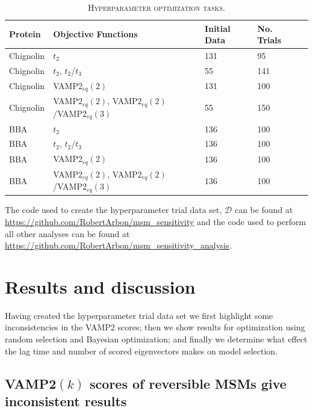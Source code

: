 \documentclass[journal=jacsat,manuscript=article]{achemso}
\begin{document}
\begin{table}[ht]
    \caption{\textsc{Hyperparameter optimization tasks.}}
    \begin{tabularx}{\textwidth}{llXXX}
    \toprule
    \textbf{Protein} & \textbf{Objective Functions} & \textbf{Initial Data} & \textbf{No. Trials} \\ 
    
    \midrule
    Chignolin & $t_2$        & 131 & 95 \\
    Chignolin & $t_2$, $t_2$/$t_3$ & 55 & 141 \\
    Chignolin & VAMP2$_{eq}(2)$ & 131 & 100 \\

    Chignolin & VAMP2$_{eq}(2)$, VAMP2$_{eq}(2)$/VAMP2$_{eq}(3)$ & 55 & 150 \\

    BBA & $t_2$        & 136 & 100 \\
    BBA & $t_2$, $t_2$/$t_3$ & 136 & 100 \\
    BBA & VAMP2$_{eq}(2)$ & 136 & 100 \\
    BBA &  VAMP2$_{eq}(2)$, VAMP2$_{eq}(2)$/VAMP2$_{eq}(3)$  & 136 & 100 \\
    \bottomrule
    \end{tabularx}
    \label{tab:opt_description}
\end{table}

The code used to create the hyperparameter trial data set, $\mathcal{D}$ can be found at \url{https://github.com/RobertArbon/msm_sensitivity} and the code used to perform all other analyses can be found at \url{https://github.com/RobertArbon/msm_sensitivity_analysis}.  

\section{Results and discussion}

Having created the hyperparameter trial data set we first highlight some inconsistencies in the VAMP2 scores; then we show results for optimization using random selection and Bayesian optimization; and finally we determine what effect the lag time and number of scored eigenvectors makes on model selection.  

\subsection{VAMP2$(k)$ scores of reversible MSMs give inconsistent results}
\end{document}
